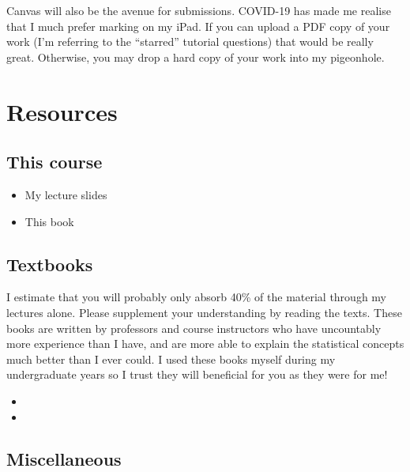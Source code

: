 \documentclass[
]{book}
\providecommand{\tightlist}{%
  \setlength{\itemsep}{0pt}\setlength{\parskip}{0pt}}
\theoremstyle{definition}
\theoremstyle{definition}
\theoremstyle{definition}
\theoremstyle{definition}
\theoremstyle{remark}
\begin{document}
Canvas will also be the avenue for submissions.
COVID-19 has made me realise that I much prefer marking on my iPad.
If you can upload a PDF copy of your work (I'm referring to the ``starred'' tutorial questions) that would be really great.
Otherwise, you may drop a hard copy of your work into my pigeonhole.

\hypertarget{resources}{%
\section*{Resources}\label{resources}}

\hypertarget{this-course}{%
\subsection*{This course}\label{this-course}}

\begin{itemize}
\tightlist
\item
  My lecture slides
\item
  This book
\end{itemize}

\hypertarget{textbooks}{%
\subsection*{Textbooks}\label{textbooks}}

I estimate that you will probably only absorb 40\% of the material through my lectures alone.
Please supplement your understanding by reading the texts.
These books are written by professors and course instructors who have uncountably more experience than I have, and are more able to explain the statistical concepts much better than I ever could.
I used these books myself during my undergraduate years so I trust they will beneficial for you as they were for me!

\begin{itemize}
\tightlist
\item
\item
\end{itemize}

\hypertarget{miscellaneous}{%
\subsection*{Miscellaneous}\label{miscellaneous}}
\end{document}
